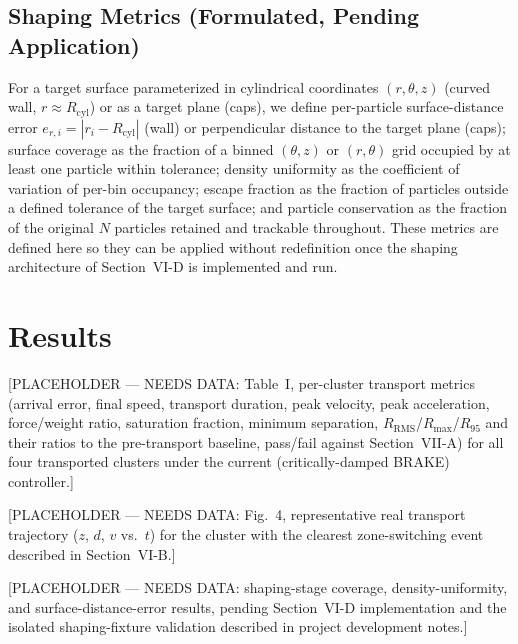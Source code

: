 \documentclass[journal]{IEEEtran}
\begin{document}
\subsection{Shaping Metrics (Formulated, Pending Application)}
For a target surface parameterized in cylindrical coordinates
$(r,\theta,z)$ (curved wall, $r\approx R_{\mathrm{cyl}}$) or as a target
plane (caps), we define per-particle surface-distance error
$e_{r,i}=|r_i-R_{\mathrm{cyl}}|$ (wall) or perpendicular distance to the
target plane (caps); surface coverage as the fraction of a binned
$(\theta,z)$ or $(r,\theta)$ grid occupied by at least one particle within
tolerance; density uniformity as the coefficient of variation of
per-bin occupancy; escape fraction as the fraction of particles outside a
defined tolerance of the target surface; and particle conservation as the
fraction of the original $N$ particles retained and trackable throughout.
These metrics are defined here so they can be applied without redefinition
once the shaping architecture of Section~VI-D is implemented and run.

\section{Results}
[PLACEHOLDER --- NEEDS DATA: Table~I, per-cluster transport metrics
(arrival error, final speed, transport duration, peak velocity, peak
acceleration, force/weight ratio, saturation fraction, minimum
separation, $R_{\mathrm{RMS}}$/$R_{\max}$/$R_{95}$ and their ratios to the
pre-transport baseline, pass/fail against Section~VII-A) for all four
transported clusters under the current (critically-damped BRAKE)
controller.]

[PLACEHOLDER --- NEEDS DATA: Fig.~4, representative real transport
trajectory ($z$, $d$, $v$ vs.\ $t$) for the cluster with the clearest
zone-switching event described in Section~VI-B.]

[PLACEHOLDER --- NEEDS DATA: shaping-stage coverage, density-uniformity,
and surface-distance-error results, pending Section~VI-D implementation
and the isolated shaping-fixture validation described in project
development notes.]

\end{document}
